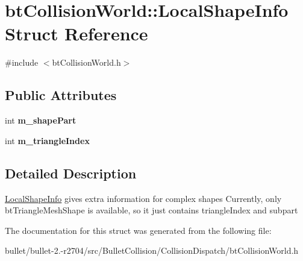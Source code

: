 \hypertarget{structbt_collision_world_1_1_local_shape_info}{\section{bt\+Collision\+World\+:\+:Local\+Shape\+Info Struct Reference}
\label{structbt_collision_world_1_1_local_shape_info}
}


{\ttfamily \#include $<$bt\+Collision\+World.\+h$>$}

\subsection*{Public Attributes}
\begin{DoxyCompactItemize}
\item 
\hypertarget{structbt_collision_world_1_1_local_shape_info_a3390c8534d107c52651b93180d6284d9}{int {\bfseries m\+\_\+shape\+Part}}\label{structbt_collision_world_1_1_local_shape_info_a3390c8534d107c52651b93180d6284d9}

\item 
\hypertarget{structbt_collision_world_1_1_local_shape_info_a2099265fc930533423ee8ef1af10d09e}{int {\bfseries m\+\_\+triangle\+Index}}\label{structbt_collision_world_1_1_local_shape_info_a2099265fc930533423ee8ef1af10d09e}

\end{DoxyCompactItemize}


\subsection{Detailed Description}
\hyperlink{structbt_collision_world_1_1_local_shape_info}{Local\+Shape\+Info} gives extra information for complex shapes Currently, only bt\+Triangle\+Mesh\+Shape is available, so it just contains triangle\+Index and subpart 

The documentation for this struct was generated from the following file\+:\begin{DoxyCompactItemize}
\item 
bullet/bullet-\/2.-\/r2704/src/\+Bullet\+Collision/\+Collision\+Dispatch/bt\+Collision\+World.\+h\end{DoxyCompactItemize}
